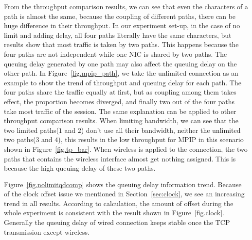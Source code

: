 From the throughput comparison results, we can see that even the characters of a path is almost the same, because the coupling of different paths, there can be huge difference in their throughput. In our experiment set-up, in the case of no limit and adding delay, all four paths literally have the same characters, but results show that most traffic is taken by two paths. This happens because the four paths are not independent while one NIC is shared by two paths. The queuing delay generated by one path may also affect the queuing delay on the other path. In Figure~\ref{fig.mpip_path}, we take the unlimited connection as an example to show the trend of throughput and queuing delay for each path. The four paths share the traffic equally at first, but as coupling among them takes effect, the proportion becomes diverged, and finally two out of the four paths take most traffic of the session.
The same explanation can be applied to other throughput comparison results. When limiting bandwidth, we can see that the two limited paths($1$ and $2$) don't use all their bandwidth, neither the unlimited two paths($3$ and $4$), this results in the low throughput for MPIP in this scenario shown in Figure~\ref{fig.tp_bar}. When wireless is applied to the connection, the two paths that contains the wireless interface almost get nothing assigned. This is because the high queuing delay of these two paths.

Figure~\ref{fig.nolimitqdcomp} shows the queuing delay information trend. Because of the clock offset issue we mentioned in Section~\ref{sec:clock}, we see an increasing trend in all results. According to calculation, the amount of offset during the whole experiment is consistent with the result shown in Figure~\ref{fig.clock}. Generally the queuing delay of wired connection keeps stable once the TCP transmission except wireless. 


